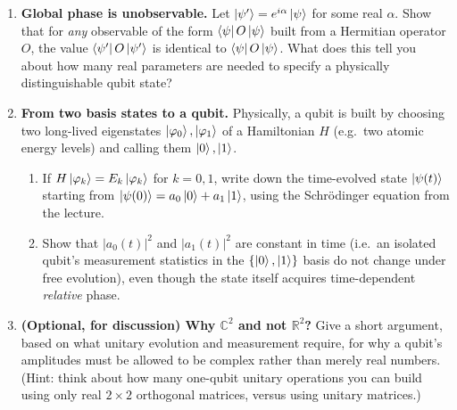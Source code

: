 \documentclass[11pt]{article}
\begin{document}
\begin{enumerate}[label=\textbf{Exercise \arabic*.}, leftmargin=2.2cm]
\item \textbf{Global phase is unobservable.}
Let $\ket{\psi'} = e^{i\alpha}\ket\psi$ for some real $\alpha$. Show that
for \emph{any} observable of the form $\bra\psi O \ket\psi$ built from a
Hermitian operator $O$, the value $\bra{\psi'} O \ket{\psi'}$ is identical
to $\bra\psi O \ket\psi$. What does this tell you about how many real
parameters are needed to specify a physically distinguishable qubit state?

\item \textbf{From two basis states to a qubit.}
Physically, a qubit is built by choosing two long-lived eigenstates
$\ket{\varphi_0},\ket{\varphi_1}$ of a Hamiltonian $H$ (e.g.\ two atomic
energy levels) and calling them $\ket0,\ket1$.
\begin{enumerate}[label=(\alph*)]
\item If $H\ket{\varphi_k} = E_k \ket{\varphi_k}$ for $k=0,1$, write down
the time-evolved state $\ket{\psi(t)}$ starting from
$\ket{\psi(0)} = a_0\ket0+a_1\ket1$, using the Schr\"odinger equation from
the lecture.
\item Show that $|a_0(t)|^2$ and $|a_1(t)|^2$ are constant in time (i.e.\
an isolated qubit's measurement statistics in the $\{\ket0,\ket1\}$ basis
do not change under free evolution), even though the state itself
acquires time-dependent \emph{relative} phase.
\end{enumerate}

\item \textbf{(Optional, for discussion) Why $\mathbb{C}^2$ and not
$\mathbb{R}^2$?}
Give a short argument, based on what unitary evolution and measurement
require, for why a qubit's amplitudes must be allowed to be complex
rather than merely real numbers. (Hint: think about how many
one-qubit unitary operations you can build using only real
$2\times2$ orthogonal matrices, versus using unitary matrices.)

\end{enumerate}
\end{document}
